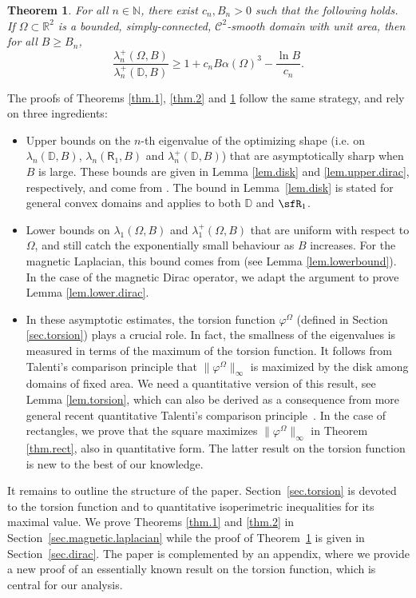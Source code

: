 \documentclass[11pt,a4paper]{amsart}
\numberwithin{figure}{section}
\numberwithin{equation}{section}
\theoremstyle{plain}%
\theoremstyle{remark}
\theoremstyle{plain}
\def\dD{{\mathbb D}}   \def\dE{{\mathbb E}}   \def\dF{{\mathbb F}}
\newtheorem{theorem}{Theorem}
\newcommand{\R}{\mathbb R}
\begin{document}
\begin{theorem}\label{thm.3}
For all $n \in \mathbb N$, there exist $c_n,B_n >0$ such that the following holds. If $\Omega \subset \R^2$ is a bounded, simply-connected, $\mathscr{C}^2$-smooth domain with unit area, then for all $B \geq B_n$,
\[ \frac{\lambda_n^+(\Omega,B)}{\lambda_n^+(\mathbb D,B)} \geq 1 + c_n B \alpha(\Omega)^3 - \frac{\ln B}{c_n}.\]
\end{theorem}

The proofs of Theorems \ref{thm.1}, \ref{thm.2} and \ref{thm.3} follow the same strategy, and rely on three ingredients:
\begin{itemize}
\item Upper bounds on the $n$-th eigenvalue of the optimizing shape (i.e. on $\lambda_n(\mathbb D,B)$, $\lambda_n(\mathsf R_1,B)$ and $\lambda_n^+(\mathbb D,B)$) that are asymptotically sharp when $B$ is large. These bounds are given in Lemma \ref{lem.disk} and \ref{lem.upper.dirac}, respectively, and come from \cite{MagneticPauli,BLRS23}. The bound in Lemma~\ref{lem.disk} is stated for general convex domains and applies to both $\dD$ and $\sfR_1$.
\item Lower bounds on $\lambda_1(\Omega,B)$ and $\lambda_1^+(\Omega,B)$ that are uniform with respect to $\Omega$, and still catch the exponentially small behaviour as $B$ increases. For the magnetic Laplacian, this bound comes from \cite{HelfferSundqvist} (see Lemma \ref{lem.lowerbound}). In the case of the magnetic Dirac operator, we adapt the argument to prove Lemma \ref{lem.lower.dirac}.
\item In these asymptotic estimates, the torsion function $\varphi^\Omega$ (defined in Section \ref{sec.torsion}) plays a crucial role. In fact, the smallness of the eigenvalues is measured in terms of the maximum of the torsion function. It follows from Talenti's comparison principle that $\| \varphi^\Omega \|_\infty$ is maximized by the disk among domains of fixed area. We need a quantitative version of this result, see Lemma \ref{lem.torsion}, which can also be derived as a consequence from more general recent quantitative Talenti's comparison principle~\cite{AL25,ABMP23}.
In the case of rectangles, we prove that the square maximizes $\| \varphi^\Omega \|_\infty$ in Theorem \ref{thm.rect}, also in quantitative form. The latter result on the torsion function is new to the best of our knowledge.
\end{itemize}
It remains to outline the structure of the paper.
Section~\ref{sec.torsion} is devoted to the torsion function
and to quantitative isoperimetric inequalities for its maximal value.
We prove Theorems \ref{thm.1} and \ref{thm.2} in Section~\ref{sec.magnetic.laplacian}  while the proof of Theorem~\ref{thm.3} is given in Section~\ref{sec.dirac}. The paper is complemented by an appendix, where we provide a new proof of
an essentially known result on the torsion function, which is central for our analysis.
\end{document}
